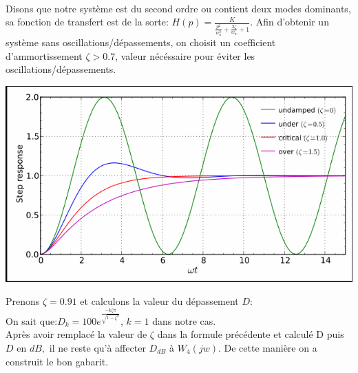 \documentclass[12pt, a4paper, openany]{report}
\begin{document}
  \paragraph{}
  Disons que notre système est du second ordre ou contient deux modes dominants, sa fonction  de transfert est de la sorte:\hspace{2mm} $ H(p)=\frac{K}{ \frac{p^{2}}{{w_{n}^{2}}} + \frac{2\zeta}{w_{n}} + 1 }$.\hspace{1mm} Afin d'obtenir un système sans oscillations/dépassements, on choisit un coefficient d'ammortissement $\zeta>0.7$, valeur nécéssaire pour éviter les oscillations/dépassements.
  
  \begin{center}
    \includegraphics[scale=0.5]{zetaa.png}
    \label{fig8}
  \end{center}
  
  
  Prenons $\zeta=0.91$\hspace{1mm} et calculons la valeur du dépassement $D $\hspace{1mm}:\\
  On sait que:\hspace{1mm}$D_{k}=100e^{\frac{-k \zeta \pi}{\sqrt{1-\zeta^{2}}}} $,\hspace{1mm} $k=1$ dans notre cas.\\
  Après avoir remplacé la valeur de $\zeta$ dans la formule précédente et calculé D puis $D$ en $dB, $ \hspace{1mm} il ne reste qu'à affecter $D_{dB}$\hspace{1mm} à  \hspace{1mm}$W_{4}(jw)$. \hspace{1mm} De cette manière on a construit le bon gabarit.\\
  
\end{document}

